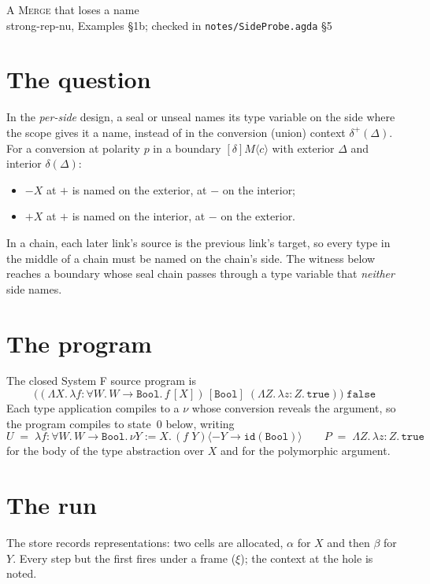 \documentclass[11pt]{article}
\newcommand{\key}[1]{\mathtt{#1}}
\newcommand{\id}[1]{\key{id}(#1)}
\newcommand{\seal}[1]{-#1}
\newcommand{\unseal}[1]{+#1}
\newcommand{\of}{{:}}
\newcommand{\tu}{{\to}}
\newcommand{\dotspace}{.\,}
\newcommand{\lam}[1]{\lambda #1 \dotspace}
\newcommand{\Lam}[1]{\Lambda #1 \dotspace}
\newcommand{\all}[1]{\forall #1 \dotspace}
\newcommand{\app}{\;}
\newcommand{\Bool}{\key{Bool}}
\newcommand{\True}{\key{true}}
\newcommand{\False}{\key{false}}
\newcommand{\by}{{:=}}
\newcommand{\nuinst}[4]{\nu #1\by #2 \dotspace (#3 \app #1) \langle #4 \rangle}
\newcommand{\boundry}[3]{\left[#2\right] #1 \langle #3 \rangle}
\begin{document}
\begin{center}
  {\Large A \textsc{Merge} that loses a name}\\[4pt]
  strong-rep-nu, Examples \S1b; checked in
  \texttt{notes/SideProbe.agda} \S5
\end{center}

\section*{The question}

In the \emph{per-side} design, a seal or unseal names its type
variable on the side where the scope gives it a name, instead of in the
conversion (union) context $\delta^{+}(\Delta)$.  For a conversion at
polarity $p$ in a boundary $\boundry{M}{\delta}{c}$ with exterior
$\Delta$ and interior $\delta(\Delta)$:
\begin{itemize}
\item $\seal{X}$ at $+$ is named on the exterior, at $-$ on the interior;
\item $\unseal{X}$ at $+$ is named on the interior, at $-$ on the exterior.
\end{itemize}
In a chain, each later link's source is the previous link's target, so
every type in the middle of a chain must be named on the chain's side.
The witness below reaches a boundary whose seal chain passes through a
type variable that \emph{neither} side names.

\section*{The program}

The closed System F source program is
\[
  \bigl((\Lam{X} \lam{f \of \all{W} W \tu \Bool} f\,[X])\,[\Bool]
     \app (\Lam{Z} \lam{z \of Z} \True)\bigr) \app \False
\]
Each type application compiles to a $\nu$ whose conversion reveals the
argument, so the program compiles to state~0 below, writing
\[
  U \;=\; \lam{f \of \all{W} W \tu \Bool}
    \nuinst{Y}{X}{f}{\seal{Y} \tu \id{\Bool}}
  \qquad
  P \;=\; \Lam{Z} \lam{z \of Z} \True
\]
for the body of the type abstraction over $X$ and for the polymorphic
argument.

\section*{The run}

The store records representations: two cells are allocated, $\alpha$ for
$X$ and then $\beta$ for $Y$.  Every step but the first fires under a
frame ($\xi$); the context at the hole is noted.
\end{document}
